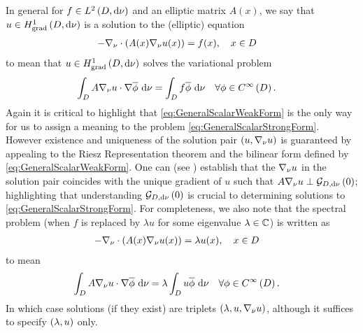 In general for $f\in L^{2}\left( D,\mathrm{d}\nu \right)$ and an elliptic matrix $A(x)$, we say that $u\in H^1_\mathrm{grad}\left( D, \mathrm{d}\nu \right)$ is a solution to the (elliptic) equation
\begin{align} \label{eq:GeneralScalarStrongForm}
	-\nabla_\nu \cdot \left( A(x)\nabla_\nu u(x) \right) &= f(x), \quad x\in D
\end{align}
to mean that $u\in H^1_\mathrm{grad}\left( D, \mathrm{d}\nu \right)$ solves the variational problem
\begin{align} \label{eq:GeneralScalarWeakForm}
	\int_{D}A\nabla_\nu u \cdot \nabla\overline{\phi} \ \mathrm{d}\nu &= \int_{D}f\overline{\phi} \ \mathrm{d}\nu \quad \forall \phi\in C^{\infty}\left( D \right).
\end{align}
Again it is critical to highlight that \eqref{eq:GeneralScalarWeakForm} is the only way for us to assign a meaning to the problem \eqref{eq:GeneralScalarStrongForm}.
However existence and uniqueness of the solution pair $\left( u,\nabla_\nu u \right)$ is guaranteed by appealing to the Riesz Representation theorem and the bilinear form defined by \eqref{eq:GeneralScalarWeakForm}.
One can (see \cite{zhikov2000extension}) establish that the $\nabla_\nu u$ in the solution pair coincides with the unique gradient of $u$ such that $A\nabla_\nu u \perp \mathcal{G}_{ D, \mathrm{d}\nu}\left( 0 \right)$; highlighting that understanding $\mathcal{G}_{ D, \mathrm{d}\nu}\left( 0 \right)$ is crucial to determining solutions to \eqref{eq:GeneralScalarStrongForm}.
For completeness, we also note that the spectral problem (when $f$ is replaced by $\lambda u$ for some eigenvalue $\lambda\in\mathbb{C}$) is written as
\begin{align*}
	-\nabla_\nu \cdot \left( A(x)\nabla_\nu u(x) \right) &= \lambda u(x), \quad x\in D
\end{align*}
to mean
\begin{align*}
	\int_{D}A\nabla_\nu u \cdot \nabla\overline{\phi} \ \mathrm{d}\nu &= \lambda\int_{D}u\overline{\phi} \ \mathrm{d}\nu \quad \forall \phi\in C^{\infty}\left( D \right).
\end{align*}
In which case solutions (if they exist) are triplets $\left( \lambda, u, \nabla_\nu u \right)$, although it suffices to specify $\left( \lambda, u \right)$ only.


